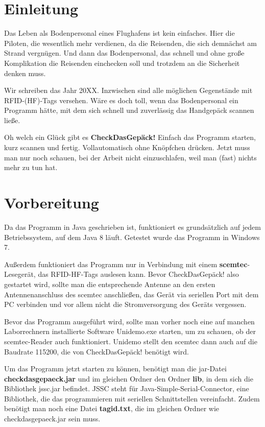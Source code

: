 \documentclass[paper=a4,fontsize=11pt,headsepline,footsepline,parskip=half]{scrartcl}
\begin{document}
\tableofcontents

\section{Einleitung}

Das Leben als Bodenpersonal eines Flughafens ist kein einfaches. Hier die Piloten, die wesentlich mehr verdienen,
da die Reisenden, die sich demnächst am Strand vergnügen. Und dann das Bodenpersonal, das schnell und ohne große
Komplikation die Reisenden einchecken soll und trotzdem an die Sicherheit denken muss.

Wir schreiben das Jahr 20XX. Inzwischen sind alle möglichen Gegenstände mit RFID-(HF)-Tags versehen. Wäre es doch
toll, wenn das Bodenpersonal ein Programm hätte, mit dem sich schnell und zuverlässig das Handgepäck scannen ließe.

Oh welch ein Glück gibt es \textbf{CheckDasGepäck!} Einfach das Programm starten, kurz scannen und fertig.
Vollautomatisch ohne Knöpfchen drücken. Jetzt muss man nur noch schauen, bei der Arbeit nicht einzuschlafen, weil
man (fast) nichts mehr zu tun hat.

\section{Vorbereitung}

Da das Programm in Java geschrieben ist, funktioniert es grundsätzlich auf jedem Betriebssystem, auf dem Java 8 läuft. Getestet wurde
das Programm in Windows 7.

Außerdem funktioniert das Programm nur in Verbindung mit einem \textbf{scemtec}-Lesegerät, das RFID-HF-Tags auslesen kann. Bevor
CheckDasGepäck! also gestartet wird, sollte man die entsprechende Antenne an den ersten Antennenanschluss des scemtec anschließen,
das Gerät via seriellen Port mit dem PC verbinden und vor allem nicht die Stromversorgung des Geräts vergessen.

Bevor das Programm ausgeführt wird, sollte man vorher noch eine auf manchen Laborrechnern installierte Software Unidemo.exe starten, um
zu schauen, ob der scemtec-Reader auch funktioniert. Unidemo stellt den scemtec dann auch auf die Baudrate 115200, die von CheckDasGepäck!
benötigt wird.

Um das Programm jetzt starten zu können, benötigt man die jar-Datei \textbf{checkdasgepaeck.jar} und im gleichen Ordner den Ordner \textbf{lib}, 
in dem sich die Bibliothek jssc.jar befindet. JSSC steht für Java-Simple-Serial-Connector, eine Bibliothek, die das programmieren mit seriellen
Schnittstellen vereinfacht. Zudem benötigt man noch eine Datei \textbf{tagid.txt}, die im gleichen Ordner wie checkdasgepaeck.jar sein muss.
\end{document}

